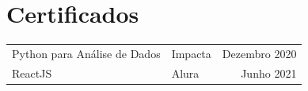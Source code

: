 \documentclass[a4paper,11pt]{article}
\begin{document}
\section{Certificados}

\begin{tabularx}{\linewidth}{@{}l X r@{}}
Python para Análise de Dados & \small Impacta & Dezembro 2020 \\[3pt]
ReactJS & \small Alura & Junho 2021 \\
\end{tabularx}

\vfill
{}
\end{document}

